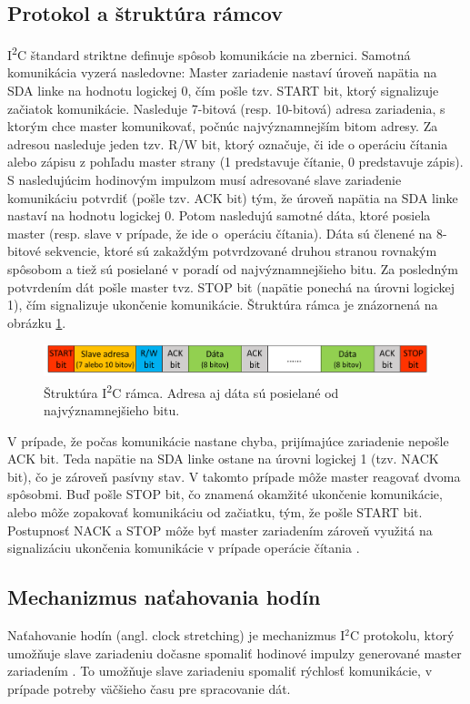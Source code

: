 \subsection{Protokol a štruktúra rámcov}
I\textsuperscript{2}C štandard striktne definuje spôsob komunikácie na zbernici. Samotná komunikácia vyzerá nasledovne: Master zariadenie nastaví úroveň napätia na SDA linke na hodnotu logickej 0, čím pošle tzv. START bit, ktorý signalizuje začiatok komunikácie. Nasleduje 7-bitová (resp. 10-bitová) adresa zariadenia, s ktorým chce master komunikovať, počnúc najvýznamnejším bitom adresy. Za adresou nasleduje jeden tzv. R/W bit, ktorý označuje, či ide o operáciu čítania alebo zápisu z pohľadu master strany (1 predstavuje čítanie, 0 predstavuje zápis). S nasledujúcim hodinovým impulzom musí adresované slave zariadenie komunikáciu potvrdiť (pošle tzv. ACK bit) tým, že úroveň napätia na SDA linke nastaví na hodnotu logickej 0. Potom nasledujú samotné dáta, ktoré posiela master (resp. slave v prípade, že ide o~operáciu čítania). Dáta sú členené na 8-bitové sekvencie, ktoré sú zakaždým potvrdzované druhou stranou rovnakým spôsobom a tiež sú posielané v poradí od najvýznamnejšieho bitu. Za posledným potvrdením dát pošle master tvz. STOP bit (napätie ponechá na úrovni logickej 1), čím signalizuje ukončenie komunikácie. Štruktúra rámca je znázornená na obrázku \ref{obr:i2cFrame}.

\begin{figure}
    \centerline{\includegraphics[width=1\textwidth]{images/busses/i2cFrame.png}}
    \caption[Štruktúra I\textsuperscript{2}C rámca]{Štruktúra I\textsuperscript{2}C rámca. Adresa aj dáta sú posielané od najvýznamnejšieho bitu.}
    \label{obr:i2cFrame}
\end{figure}

V prípade, že počas komunikácie nastane chyba, prijímajúce zariadenie nepošle ACK bit. Teda napätie na SDA linke ostane na úrovni logickej 1 (tzv. NACK bit), čo je zároveň pasívny stav. V takomto prípade môže master reagovať dvoma spôsobmi. Buď pošle STOP bit, čo znamená okamžité ukončenie komunikácie, alebo môže zopakovať komunikáciu od začiatku, tým, že pošle START bit. Postupnosť NACK a STOP môže byť master zariadením zároveň využitá na signalizáciu ukončenia komunikácie v prípade operácie čítania \cite{i2cSpec}.

\subsection{Mechanizmus naťahovania hodín}
Naťahovanie hodín (angl. clock stretching) je mechanizmus I$^2$C protokolu, ktorý umožňuje slave zariadeniu dočasne spomaliť hodinové impulzy generované master zariadením \cite{i2cSpec}. To umožňuje slave zariadeniu spomaliť rýchlosť komunikácie, v prípade potreby väčšieho času pre spracovanie dát.

